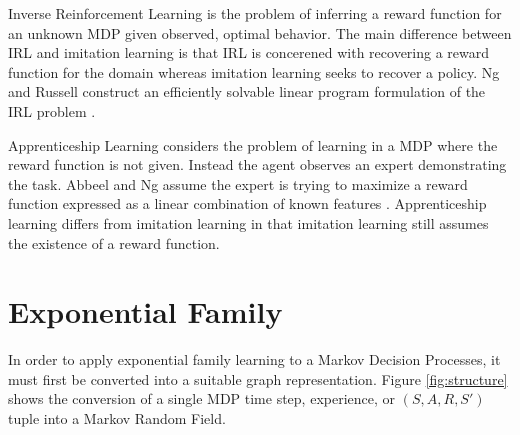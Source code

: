 \documentclass{article} %
\begin{document}
Inverse Reinforcement Learning is the problem of inferring a reward function for an unknown MDP given observed, optimal behavior. The main difference between IRL and imitation learning is that IRL is concerened with recovering a reward function for the domain whereas imitation learning seeks to recover a policy. Ng and Russell construct an efficiently solvable linear program formulation of the IRL problem \cite{ng00}. 

Apprenticeship Learning considers the problem of learning in a MDP where the reward function is not given. Instead the agent observes an expert demonstrating the task. Abbeel and Ng assume the expert is trying to maximize a reward function expressed as a linear combination of known features \cite{abbeel04}. Apprenticeship learning differs from imitation learning in that imitation learning still assumes the existence of a reward function.

\section{Exponential Family}
In order to apply exponential family learning to a Markov Decision Processes, it must first be converted into a suitable graph representation. Figure \ref{fig:structure} shows the conversion of a single MDP time step, experience, or $(S,A,R,S')$ tuple into a Markov Random Field. 
\end{document}
